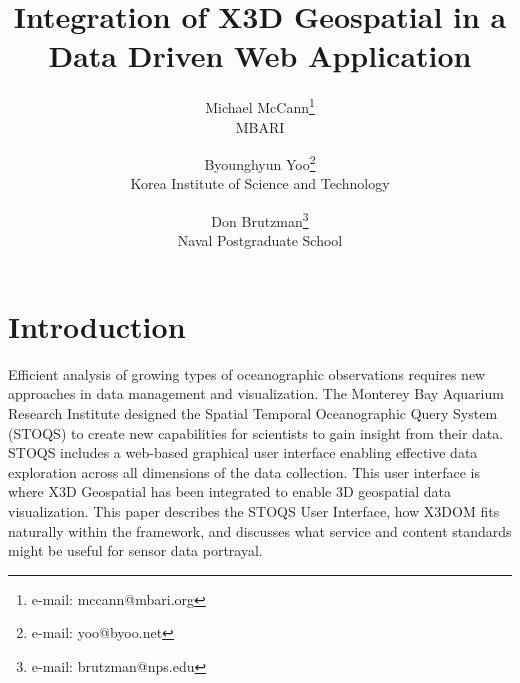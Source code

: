 \documentclass[annualconference]{acmsiggraph}  %
\title{Integration of X3D Geospatial in a Data Driven Web Application}
\author{Michael McCann\thanks{e-mail: mccann@mbari.org}\\MBARI
\and Byounghyun Yoo\thanks{e-mail: yoo@byoo.net}\\Korea Institute of Science and Technology
\and Don Brutzman\thanks{e-mail: brutzman@nps.edu}\\Naval Postgraduate School}
\begin{document}

\maketitle








\section{Introduction}

Efficient analysis of growing types of oceanographic observations requires new approaches in data management and visualization. The Monterey Bay Aquarium Research Institute designed the Spatial Temporal Oceanographic Query System (STOQS) to create new capabilities for scientists to gain insight from their data. STOQS includes a web-based graphical user interface enabling effective data exploration across all dimensions of the data collection. This user interface is where X3D Geospatial has been integrated to enable 3D geospatial data visualization. This paper describes the STOQS User Interface, how X3DOM fits naturally within the framework, and discusses what service and content standards might be useful for sensor data portrayal. 
\end{document}
